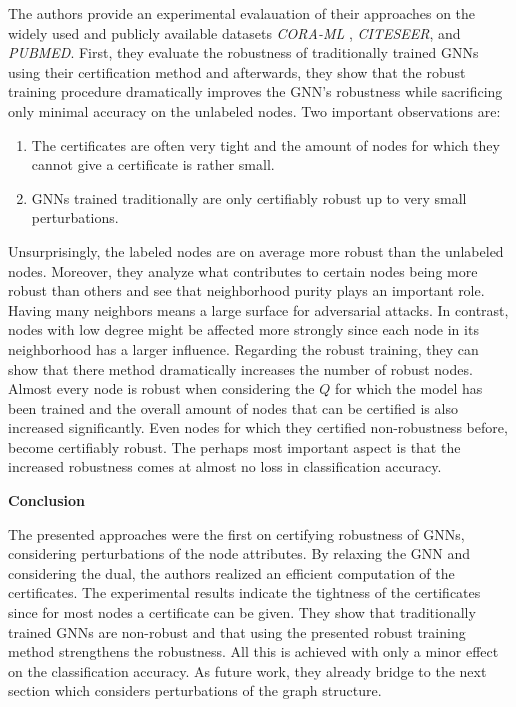 \documentclass[a4paper,preprint]{sig-alternate}
\begin{document}
The authors provide an experimental evalauation of their approaches on the widely used and publicly available datasets \textit{CORA-ML}
, \textit{CITESEER}, and \textit{PUBMED}. First, they evaluate the robustness of traditionally trained GNNs using their certification method and
afterwards, they show that the robust training procedure dramatically improves the GNN's robustness while sacrificing
only minimal accuracy on the unlabeled nodes. Two important observations are:
\begin{enumerate}
    \item The certificates are often very tight and the amount of nodes for which they cannot give a certificate is rather small.
    \item GNNs trained traditionally are only certifiably robust up to very small perturbations.
\end{enumerate}
Unsurprisingly, the labeled nodes are on average more robust than the unlabeled nodes. Moreover, they analyze what contributes to certain
nodes being more robust than others and see that neighborhood purity plays an important role. Having many neighbors means a large 
surface for adversarial attacks. In contrast, nodes with low degree might be affected more strongly since each node in its neighborhood
has a larger influence.\newline
Regarding the robust training, they can show that there method dramatically increases the number of robust nodes. Almost every node
is robust when considering the $Q$ for which the model has been trained and the overall amount of nodes that can be certified is also 
increased significantly. Even nodes for which they certified non-robustness before, become certifiably robust.
The perhaps most important aspect is that the increased robustness comes at almost no loss in classification accuracy.

\textbf{Conclusion}\newline

The presented approaches were the first on certifying robustness of GNNs, considering perturbations of the node attributes.
By relaxing the GNN and considering the dual, the authors realized an efficient computation of the certificates.
The experimental results indicate the tightness of the certificates since for most nodes a certificate can be given.
They show that traditionally trained GNNs are non-robust and that using the presented robust training method strengthens the robustness.
All this is achieved with only a minor effect on the classification accuracy. 
As future work, they already bridge to the next section which considers perturbations of the graph structure.
\end{document}
